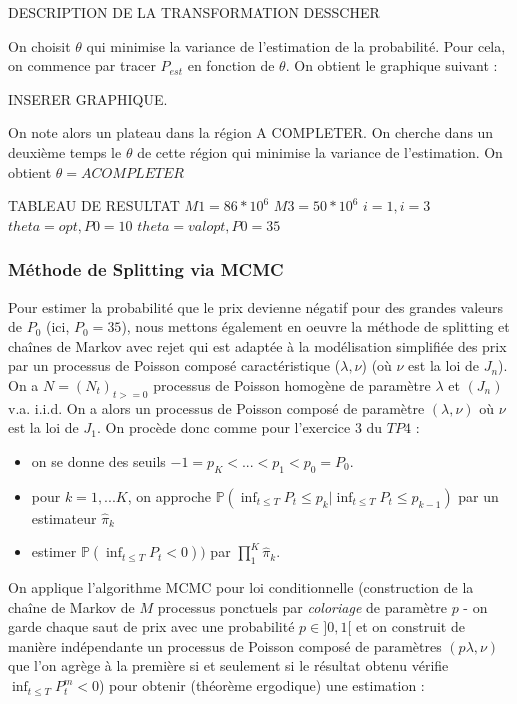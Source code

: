 \documentclass[a4paper,11pt]{article}
\begin{document}
DESCRIPTION DE LA TRANSFORMATION DESSCHER

On choisit $\theta$ qui minimise la variance de l'estimation de la probabilité. Pour cela, on commence par tracer $P_{est}$ en fonction de $\theta$. On obtient le graphique suivant :

INSERER GRAPHIQUE.

On note alors un plateau dans la région A COMPLETER. On cherche dans un deuxième temps le $\theta$ de cette région qui minimise la variance de l'estimation. 
On obtient $\theta= A COMPLETER$

TABLEAU DE RESULTAT
$M1=86 * 10^6$
$M3=50 * 10^6$
$i=1, i=3$
$theta=opt, P0=10$
$theta=val opt, P0=35$

\subsubsection{Méthode de Splitting via MCMC}
Pour estimer la probabilité que le prix devienne négatif pour des grandes valeurs de $P_0$ (ici, $P_0 = 35$), nous mettons également en oeuvre la méthode de splitting et chaînes de Markov avec rejet qui est adaptée à la modélisation simplifiée des prix par un processus de Poisson composé caractéristique ($\lambda,\nu$) (où $\nu$ est la loi de $J_n$).\\

On a $N = (N_t)_{t>=0}$ processus de Poisson homogène de paramètre $\lambda$ et $(J_n)$ v.a. i.i.d. On a alors un processus de Poisson composé de paramètre $(\lambda,\nu)$ où $\nu$ est la loi de $J_1$.
On procède donc comme pour l'exercice $3$ du $TP4$ :
 
\begin{itemize}
\item on se donne des seuils $-1=p_K<...<p_1<p_0=P_0$.\\
\item pour $k=1,...K$, on approche $\mathbb{P} (\inf_{t \leq T} P_t \leq p_k | \inf_{t \leq T} P_t \leq p_{k-1})$ par un estimateur $\widehat{\pi}_k$\\
\item estimer $\mathbb{P} (\inf_{t \leq T} P_t < 0))$ par $\prod_1^K \widehat{\pi}_k$.\\
\end{itemize}

On applique l'algorithme MCMC pour loi conditionnelle (construction de la chaîne de Markov de $M$ processus ponctuels par \textit{coloriage} de paramètre $p$ - on garde chaque saut de prix avec une probabilité $p \in ]0,1[$ et on construit de manière indépendante un processus de Poisson composé de paramètres $(p\lambda,\nu)$ que l'on agrège à la première si et seulement si le résultat obtenu vérifie $\inf_{t \leq T} P_t^m < 0$) pour obtenir (théorème ergodique) une estimation :
\end{document}

